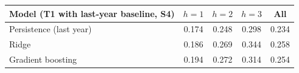 \begin{tabular}{lcccc}
\toprule
Model (T1 with last-year baseline, S4) & $h=1$ & $h=2$ & $h=3$ & All \\
\midrule
Persistence (last year) & 0.174 & 0.248 & 0.298 & 0.234 \\
Ridge & 0.186 & 0.269 & 0.344 & 0.258 \\
Gradient boosting & 0.194 & 0.272 & 0.314 & 0.254 \\
\bottomrule
\end{tabular}
